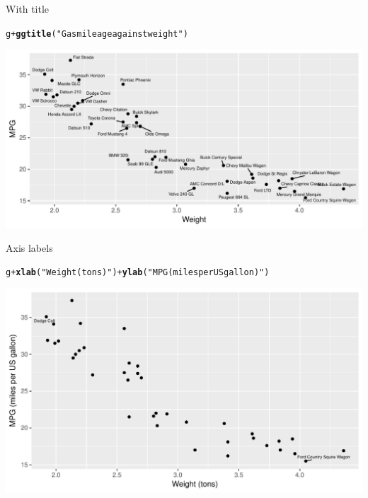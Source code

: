 \documentclass[unknownkeysallowed]{beamer}\usepackage[]{graphicx}\usepackage[]{color}
\makeatletter
\def\maxwidth{ %
  \ifdim\Gin@nat@width>\linewidth
    \linewidth
  \else
    \Gin@nat@width
  \fi
}
\newcommand{\hlstr}[1]{\textcolor[rgb]{0.192,0.494,0.8}{#1}}%
\newcommand{\hlopt}[1]{\textcolor[rgb]{0,0,0}{#1}}%
\newcommand{\hlstd}[1]{\textcolor[rgb]{0.345,0.345,0.345}{#1}}%
\newcommand{\hlkwd}[1]{\textcolor[rgb]{0.737,0.353,0.396}{\textbf{#1}}}%
\newenvironment{kframe}{%
 \def\at@end@of@kframe{}%
 \ifinner\ifhmode%
  \def\at@end@of@kframe{\end{minipage}}%
  \begin{minipage}{\columnwidth}%
 \fi\fi%
 \def\FrameCommand##1{\hskip\@totalleftmargin \hskip-\fboxsep
 \colorbox{shadecolor}{##1}\hskip-\fboxsep
     \hskip-\linewidth \hskip-\@totalleftmargin \hskip\columnwidth}%
 \MakeFramed {\advance\hsize-\width
   \@totalleftmargin\z@ \linewidth\hsize
   \@setminipage}}%
 {\par\unskip\endMakeFramed%
 \at@end@of@kframe}
\newenvironment{knitrout}{}{} %
\makeatother
\begin{document}
\begin{frame}[fragile]{With title}
  
\begin{knitrout}
\color{fgcolor}\begin{kframe}
\begin{alltt}
\hlstd{g}\hlopt{+}\hlkwd{ggtitle}\hlstd{(}\hlstr{"Gas mileage against weight"}\hlstd{)}
\end{alltt}
\end{kframe}
\includegraphics[width=\maxwidth]{figure/unnamed-chunk-425-1} 

\end{knitrout}
  
\end{frame}

\begin{frame}[fragile]{Axis labels}
  
\begin{knitrout}
\color{fgcolor}\begin{kframe}
\begin{alltt}
\hlstd{g}\hlopt{+}\hlkwd{xlab}\hlstd{(}\hlstr{"Weight (tons)"}\hlstd{)}\hlopt{+}\hlkwd{ylab}\hlstd{(}\hlstr{"MPG (miles per US gallon)"}\hlstd{)}
\end{alltt}
\end{kframe}
\includegraphics[width=\maxwidth]{figure/unnamed-chunk-426-1} 

\end{knitrout}
  
\end{frame}
\end{document}
